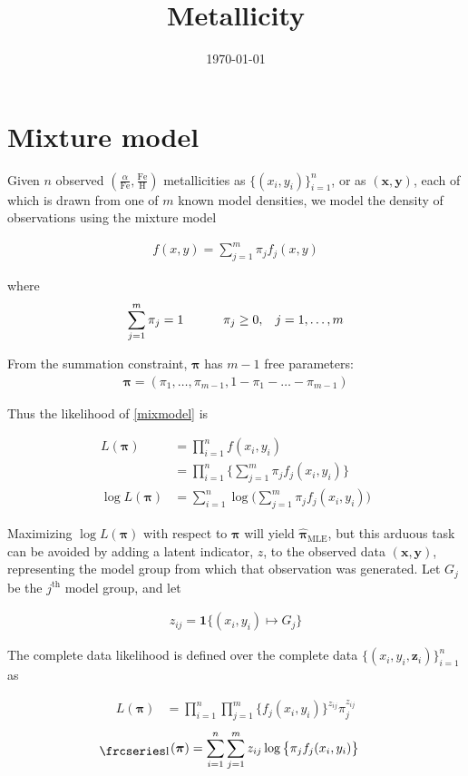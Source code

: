 \documentclass[12pt]{amsart}
\title{Metallicity}
\author{\today}
\newcommand{\textfrc}[1]{{\frcseries#1}}
\newcommand{\mathfrc}[1]{\raisebox{-0.8mm}{\text{\textfrc{\small #1}}}\hspace{0.4mm}}
\newcommand{\vect}[1]{\boldsymbol{\mathbf{#1}}}
\newcommand{\eqn}[1]{\begin{align*}
#1
\end{align*}}
\newcommand{\eqnl}[2]{\begin{align} \label{#1}
#2
\end{align}}
\newcommand{\shblock}{\hspace{3mm}}
\newcommand{\hblock}{\hspace{8mm}}
\newcommand{\eqnsep}{\shblock\hblock}
\newcommand{\bl}{\big\{}
\newcommand{\br}{\big\}}
\newcommand{\Bl}{\Big\{}
\newcommand{\Br}{\Big\}}
\newcommand{\indicator}{\mathbf{1}}
\newcommand{\vx}{\vect{x}}
\newcommand{\vy}{\vect{y}}
\newcommand{\vp}{\vect{\pi}}
\newcommand{\vpmle}{\hat{\vect{\pi}}_\text{MLE}}
\newcommand{\fab}{f_j}
\newcommand{\llp}{\mathfrc{l}(\vect{\pi})}
\newcommand{\sumn}{\sum^n_{i=1}}
\newcommand{\summ}{\sum^m_{j=1}}
\begin{document}
\maketitle






\section{Mixture model}

Given $n$ observed $(\frac{\alpha}{\text{Fe}}, \frac{\text{Fe}}{\text{H}})$ metallicities as $\bl (x_i,y_i) \br^n_{i=1}$, or as $(\vx,\vy)$, each of which is drawn from one of $m$ known model densities, we model the density of observations using the mixture model

\eqnl{mixmodel}{
	f(x,y) = \summ \pi_j \fab(x,y)
}

where \eqn{
	\summ \pi_j = 1 \eqnsep \pi_j \geq 0, \hspace{3mm} j=1,\ldots,m
 }

From the summation constraint, $\vp$ has $m-1$ free parameters: \eqn{
	\vp = (\pi_1, \ldots, \pi_{m-1}, 1-\pi_1-\ldots-\pi_{m-1})
}

Thus the likelihood of \eqref{mixmodel} is

\eqn{
	L(\vect{\pi}) &= \prod^n_{i=1} f(x_i,y_i)	 \\
	&= \prod^n_{i=1} \Bl  \summ \pi_j \fab(x_i,y_i)  \Br	\\
	\log L(\vect{\pi}) &= \sumn \log \Big( \summ \pi_j \fab(x_i,y_i)  \Big)
}

Maximizing $\log L(\vect{\pi})$ with respect to $\vp$ will yield $\vpmle$, but this arduous task can be avoided by adding a latent indicator, $z$, to the observed data $(\vx, \vy)$, representing the model group from which that observation was generated. Let $G_j$ be the $j^\text{th}$ model group, and let

\eqn{z_{ij} = \indicator \bl (x_i,y_i) \mapsto G_j \br}


The complete data likelihood is defined over the complete data $\bl (x_i,y_i,\vect{z}_i) \br^n_{i=1}$ as

\eqn{
	L(\vect{\pi}) &= \prod^n_{i=1} \prod^m_{j=1} \Bl \fab(x_i,y_i) \Br ^{z_{ij}} \pi_j^{z_{ij}}
}
\eqnl{loglike}{
	\llp &= \sumn \summ z_{ij}  \log \bl \pi_j  \fab(x_i,y_i) \br
}





\end{document}
